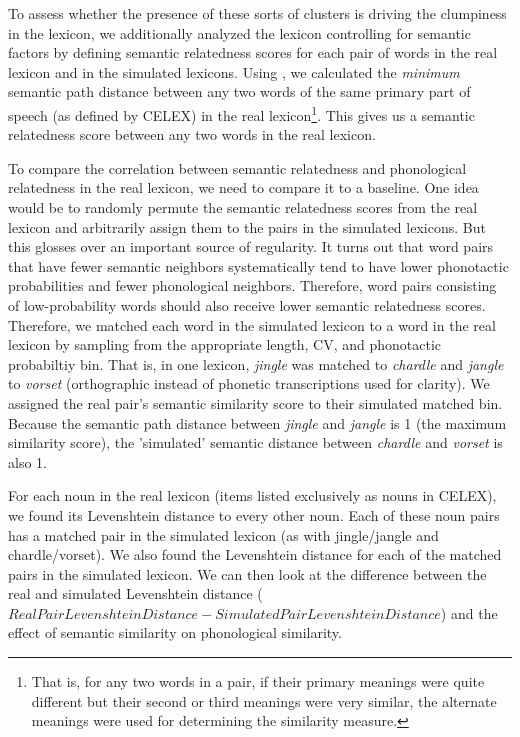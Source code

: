 \documentclass{article}
\begin{document}
To assess whether the presence of these sorts of clusters is driving the clumpiness in the lexicon, we
additionally analyzed the lexicon controlling for semantic factors by defining semantic relatedness scores for
each pair of words in the real lexicon and in the simulated lexicons. Using \cite{fellbaum_wordnet_2010}, we
calculated the \textit{minimum} semantic path distance between any two words of the same primary part of
speech (as defined by CELEX) in the real lexicon\footnote{That is, for any two words in a pair, if their
primary meanings were quite different but their second or third meanings were very similar, the alternate
meanings were used for determining the similarity measure.}. This gives us a semantic relatedness score
between any two words in the real lexicon.

To compare the correlation between semantic relatedness and phonological relatedness in the real lexicon, we
need to compare it to a baseline. One idea would be to randomly permute the semantic relatedness scores from
the real lexicon and arbitrarily assign them to the pairs in the simulated lexicons. But this glosses over an
important source of regularity. It turns out that word pairs that have fewer semantic neighbors systematically
tend to have lower phonotactic probabilities and fewer phonological neighbors. Therefore, word pairs
consisting of low-probability words should also receive lower semantic relatedness scores. Therefore, we
matched each word in the simulated lexicon to a word in the real lexicon by sampling from the appropriate
length, CV, and phonotactic probabiltiy bin. That is, in one lexicon, \textit{jingle} was matched to
\textit{chardle} and \textit{jangle} to \textit{vorset} (orthographic instead of phonetic transcriptions used
for clarity). We assigned the real pair's semantic similarity score to their simulated matched bin. Because
the semantic path distance between \textit{jingle} and \textit{jangle} is 1 (the maximum similarity score),
the 'simulated' semantic distance between \textit{chardle} and \textit{vorset} is also 1.

For each noun in the real lexicon (items listed exclusively as nouns in CELEX), we found its Levenshtein
distance to every other noun. Each of these noun pairs has a matched pair in the simulated lexicon (as with
jingle/jangle and chardle/vorset). We also found the Levenshtein distance for each of the matched pairs in the
simulated lexicon. We can then look at the difference between the real and simulated Levenshtein distance
($RealPairLevenshteinDistance - SimulatedPairLevenshteinDistance$) and the effect of semantic similarity on
phonological similarity.
\end{document}
